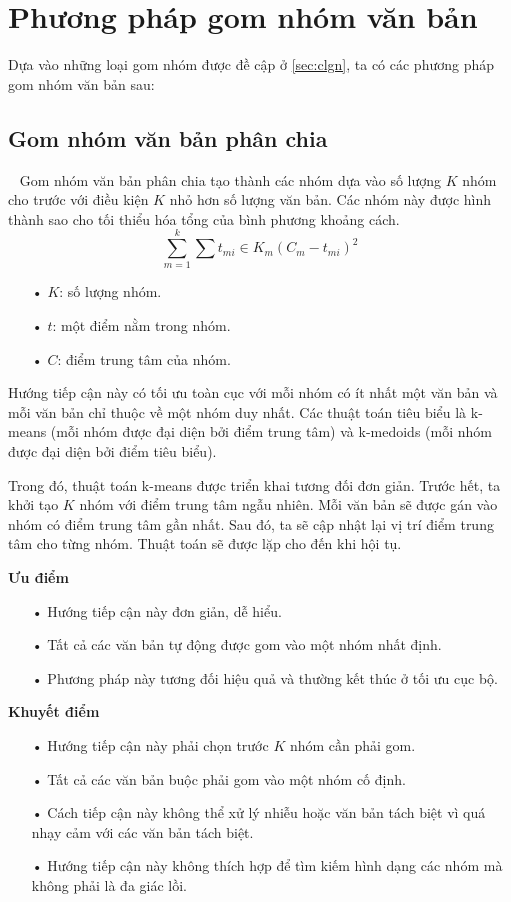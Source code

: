 \section{Phương pháp gom nhóm văn bản}
\label{sec:ppgn}
Dựa vào những loại gom nhóm được đề cập ở \ref{sec:clgn}, ta có các phương pháp gom nhóm văn bản sau:
\subsection{Gom nhóm văn bản phân chia}
~\cite{partitioning-clustering, partitioning-clustering-Krish} Gom nhóm văn bản phân chia tạo thành các nhóm dựa vào số lượng $K$ nhóm cho trước với điều kiện $K$ nhỏ hơn số lượng văn bản.
Các nhóm này được hình thành sao cho tối thiểu hóa tổng của bình phương khoảng cách.
\begin{equation}
\sum_{m=1}^k \sum{t_{mi} \in K_m} (C_m - t_{mi})^2
\end{equation}

\begin{enumerate}
\item[•]$K$: số lượng nhóm.
\item[•]$t$: một điểm nằm trong nhóm.
\item[•]$C$: điểm trung tâm của nhóm.
\end{enumerate}

Hướng tiếp cận này có tối ưu toàn cục với mỗi nhóm có ít nhất một văn bản và mỗi văn bản chỉ thuộc về một nhóm duy nhất.
Các thuật toán tiêu biểu là k-means (mỗi nhóm được đại diện bởi điểm trung tâm) và k-medoids (mỗi nhóm được đại diện bởi điểm tiêu biểu).

Trong đó, thuật toán k-means được triển khai tương đối đơn giản.
Trước hết, ta khởi tạo $K$ nhóm với điểm trung tâm ngẫu nhiên.
Mỗi văn bản sẽ được gán vào nhóm có điểm trung tâm gần nhất.
Sau đó, ta sẽ cập nhật lại vị trí điểm trung tâm cho từng nhóm.
Thuật toán sẽ được lặp cho đến khi hội tụ.

\textbf{Ưu điểm}
\begin{enumerate}
\item[•]Hướng tiếp cận này đơn giản, dễ hiểu.
\item[•]Tất cả các văn bản tự động được gom vào một nhóm nhất định.
\item[•]Phương pháp này tương đối hiệu quả và thường kết thúc ở tối ưu cục bộ.
\end{enumerate}

\textbf{Khuyết điểm}
\begin{enumerate}
\item[•]Hướng tiếp cận này phải chọn trước $K$ nhóm cần phải gom.
\item[•]Tất cả các văn bản buộc phải gom vào một nhóm cố định.
\item[•]Cách tiếp cận này không thể xử lý nhiễu hoặc văn bản tách biệt vì quá nhạy cảm với các văn bản tách biệt.
\item[•]Hướng tiếp cận này không thích hợp để tìm kiếm hình dạng các nhóm mà không phải là đa giác lồi.
\end{enumerate}


